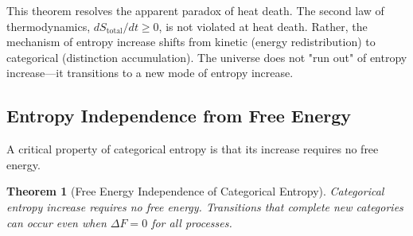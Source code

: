 \documentclass[12pt,a4paper]{article}
\newtheorem{theorem}{Theorem}[section]
\theoremstyle{definition}
\theoremstyle{remark}
\begin{document}
This theorem resolves the apparent paradox of heat death. The second law of thermodynamics, $dS_{\text{total}}/dt \geq 0$, is not violated at heat death. Rather, the mechanism of entropy increase shifts from kinetic (energy redistribution) to categorical (distinction accumulation). The universe does not "run out" of entropy increase—it transitions to a new mode of entropy increase.

\subsection{Entropy Independence from Free Energy}

A critical property of categorical entropy is that its increase requires no free energy.

\begin{theorem}[Free Energy Independence of Categorical Entropy]
\label{thm:free_energy_independence_entropy}
Categorical entropy increase requires no free energy. Transitions that complete new categories can occur even when $\Delta F = 0$ for all processes.
\end{theorem}
\end{document}
